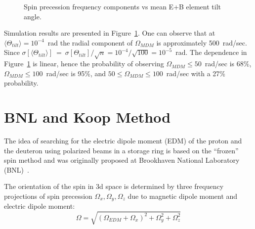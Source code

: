 \documentclass[a4paper]{jpconf}
\newcommand{\avg}[1]{\langle{#1}\rangle}
\newcommand{\W}{\Omega}
\begin{document}
\begin{figure}[h]
\begin{minipage}{.5\linewidth}
		\caption{Spin precession frequency components vs mean E+B element tilt angle.\label{fig:MDM_vs_tilt}}
	\end{minipage}
\end{figure}


Simulation results are presented in Figure~\ref{fig:MDM_vs_tilt}. One can observe that at $\avg{\Theta_{tilt}}=10^{-4}$~rad the radial component of $\W_{MDM}$ is approximately 500~rad/sec. 
Since $\sigma[\avg{\Theta_{tilt}}]~=~\sigma[\Theta_{tilt}]/\sqrt{n} = 10^{-4}/\sqrt{100} = 10^{-5}$~rad. The dependence in Figure~\ref{fig:MDM_vs_tilt} is linear, hence the probability of observing $\W_{MDM}\le 50$~rad/sec is 68\%, $\W_{MDM}\le 100$~rad/sec is 95\%, and $50\le\W_{MDM}\le100$~rad/sec with a 27\% probability.


\section{BNL and Koop Method}
The idea of searching for the electric dipole moment (EDM) of the proton and the deuteron using polarized beams in a storage ring is based on the ``frozen'' spin method and was originally proposed at Brookhaven National Laboratory (BNL)~\cite{Farley}.

The orientation of the spin in 3d space is determined by three frequency projections of spin precession $\W_x, \W_y, \W_z$ due to magnetic dipole moment and electric dipole moment:
\begin{equation}\label{eq:Omega}
\W=\sqrt{\left(\W_{EDM}+\W_x\right)^2+\W_y^2+\W_z^2}	
\end{equation}
\end{document}
